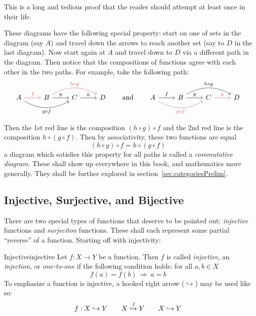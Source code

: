 \documentclass{book}
\newcommand{\rw}{\rightarrow}
\newcommand{\Rw}{\Rightarrow}
\begin{document}
\begin{Proof}
	This is a long and tedious proof that the reader should attempt at least once in their life.
\end{Proof}


These diagrams have the following special property: start on one of sets in the diagram (say $A$) and travel
down the arrows to reach another set (say to $D$ in the last diagram). Now start again at $A$ and travel down
to $D$ via a different path in the diagram. Then notice that the compositions of functions agree with each
other in the two paths. For example, take the following path:
\[\begin{tikzcd}
	A & B & C & D
	\arrow["f", color={rgb,255:red,214;green,92;blue,92}, from=1-1, to=1-2]
	\arrow["g", from=1-2, to=1-3]
	\arrow["h", from=1-3, to=1-4]
	\arrow["{g\circ f}"', bend right, from=1-1, to=1-3]
	\arrow["{h\circ g}", color={rgb,255:red,214;green,92;blue,92}, bend left, from=1-2, to=1-4]
\end{tikzcd} \qquad \text{and} \qquad
\begin{tikzcd}
	A & B & C & D
	\arrow["f", from=1-1, to=1-2]
	\arrow["g", from=1-2, to=1-3]
	\arrow["h", color={rgb,255:red,214;green,92;blue,92}, from=1-3, to=1-4]
	\arrow["{g\circ f}"', color={rgb,255:red,214;green,92;blue,92}, bend right, from=1-1, to=1-3]
	\arrow["{h\circ g}", bend left, from=1-2, to=1-4]
\end{tikzcd}
\]

Then the 1st red line is the composition $(h\circ g)\circ f$ and the 2nd red line is the composition $h\circ
(g\circ f)$. Then by associativity, these two functions are equal
\[
	(h\circ g)\circ f = h\circ (g\circ f)
\]
a diagram which satisfies this property for all paths is called a \emph{commutative diagram}. These shall show
up everywhere in this book, and mathematics more generally. They shall be further explored in
section~\ref{sec:categoriesPrelim}.

\subsection*{Injective, Surjective, and Bijective}



There are two special types of functions that deserve to be pointed out: \emph{injective} functions and
\emph{surjeciton} functions. These shall each represent some partial ``reverse'' of a function. Starting off
with injectivity:

\begin{defn}{Injective}{injective}
	Let $f: X \rw Y$ be a function. Then $f$ is called \emph{injective}, an \emph{injection}, or
	\emph{one-to-one} if the following condition holds: for
	all $a,b \in X$
	\[
		f(a) = f(b)\ \Rw\ a = b
	\]
	To emphasize a function is injective, a hooked right arrow ($\hookrightarrow$) may be used like so:
	\[
		f: X \hookrightarrow Y \qquad X \xhookrightarrow{f} Y \qquad X\hookrightarrow Y
	\]
\end{defn}
\end{document}
